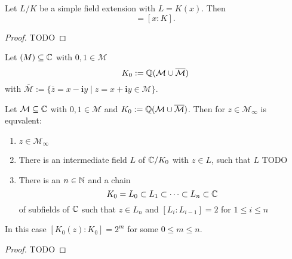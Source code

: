 \documentclass{../Project/TemplateExercise}
\begin{document}
\begin{theorem}
\label{thm:degree_of_simple_field_extension}
    Let $L/K$ be a simple field extension with $L = K(x)$. Then
    \begin{equation*}
        [L:K] = [x:K].
    \end{equation*}
\end{theorem}
\begin{proof}
    TODO %
\end{proof}
\begin{definition}
    Let $\mathcal(M)\subseteq\mathbb{C}$ with $0,1 \in \mathcal{M}$
    \begin{equation*}
        K_0 := \mathbb{Q}(\mathcal{M}\cup \overline{\mathcal{M}})
    \end{equation*}
    with $\overline{\mathcal{M}} := \{ \overline{z} = x - \textbf{i}y \mid z = x+\textbf{i}y  \in \mathcal{M} \}$.
\end{definition}
\begin{theorem}
\label{thm:degree_of_constructable_points}
    Let $\mathcal{M}\subseteq\mathbb{C}$ with $0,1 \in \mathcal{M}$ and $K_0 := \mathbb{Q}(\mathcal{M}\cup \overline{\mathcal{M}})$.
    Then for $z \in \mathcal{M}_{\infty}$ is equvalent:
    \begin{enumerate}
        \item $z \in \mathcal{M}_{\infty}$
        \item There is an intermediate field $L$ of $\mathbb{C}/K_0$ with $z \in L$, such that $L$
        TODO %
        \item There is an $n \in \mathbb{N}$ and a chain \begin{equation*}
            K_0 = L_0 \subset L_1 \subset \dots \subset L_n \subset \mathbb{C}
        \end{equation*}
        of subfields of $\mathbb{C}$ such that $z \in L_n$ and $[L_i:L_{i-1}] =2$ for $1\le i\le n$ %
    \end{enumerate}
    In this case $[K_0(z):K_0] = 2^m$ for some $0 \le m \le n$.
\end{theorem}
\begin{proof}
   TODO %
\end{proof}
\end{document}
